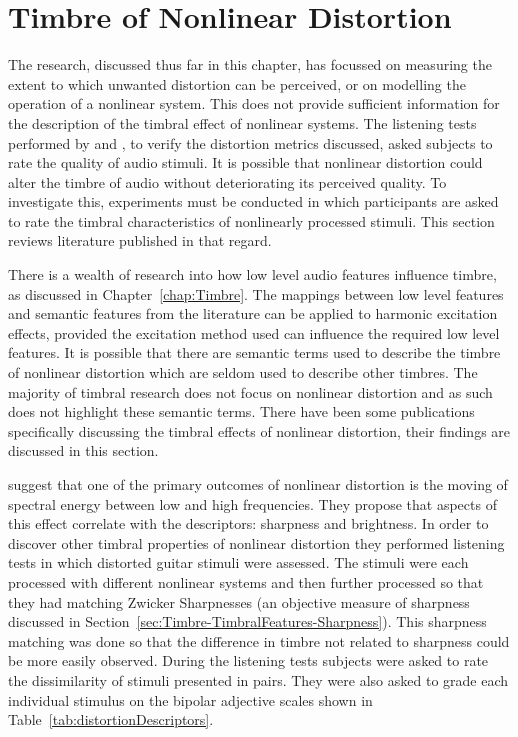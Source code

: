 \section{Timbre of Nonlinear Distortion}
\label{sec:Excitation-Timbre}
	The research, discussed thus far in this chapter, has focussed on measuring the extent to which unwanted distortion
	can be perceived, or on modelling the operation of a nonlinear system. This does not provide sufficient information
	for the description of the timbral effect of nonlinear systems. The listening tests performed by
	\citet{lee2003auditory} and \citet{tan2004predicting}, to verify the distortion metrics discussed, asked subjects
	to rate the quality of audio stimuli. It is possible that nonlinear distortion could alter the timbre of audio
	without deteriorating its perceived quality. To investigate this, experiments must be conducted in which
	participants are asked to rate the timbral characteristics of nonlinearly processed stimuli. This section reviews
	literature published in that regard.

	There is a wealth of research into how low level audio features influence timbre, as discussed in
	Chapter~\ref{chap:Timbre}. The mappings between low level features and semantic features from the literature can be
	applied to harmonic excitation effects, provided the excitation method used can influence the required low level
	features.  It is possible that there are semantic terms used to describe the timbre of nonlinear distortion which
	are seldom used to describe other timbres. The majority of timbral research does not focus on nonlinear distortion
	and as such does not highlight these semantic terms. There have been some publications specifically discussing the
	timbral effects of nonlinear distortion, their findings are discussed in this section.

	\citet{marui2005predicting} suggest that one of the primary outcomes of nonlinear distortion is the moving of
	spectral energy between low and high frequencies. They propose that aspects of this effect correlate with the
	descriptors: sharpness and brightness. In order to discover other timbral properties of nonlinear distortion they
	performed listening tests in which distorted guitar stimuli were assessed. The stimuli were each processed with
	different nonlinear systems and then further processed so that they had matching Zwicker Sharpnesses (an objective
	measure of sharpness \citep{fastl2007psychoacoustics} discussed in
	Section~\ref{sec:Timbre-TimbralFeatures-Sharpness}). This sharpness matching was done so that the difference in
	timbre not related to sharpness could be more easily observed. During the listening tests subjects were asked to
	rate the dissimilarity of stimuli presented in pairs. They were also asked to grade each individual stimulus on the
	bipolar adjective scales shown in Table~\ref{tab:distortionDescriptors}.

